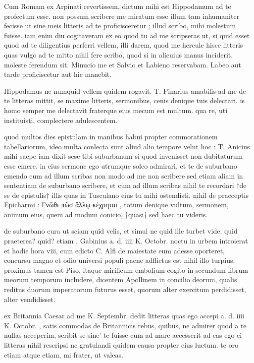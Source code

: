  Cum Romam ex Arpinati revertissem, dictum mihi est Hippodamum ad te profectum esse. non possum scribere me miratum esse illum tam inhumaniter fecisse ut sine meis litteris ad te proficisceretur ; illud scribo, mihi molestum fuisse. iam enim diu cogitaveram ex eo quod tu ad me scripseras ut, si quid esset quod ad te diligentius perferri vellem, illi darem, quod me hercule hisce litteris quas vulgo ad te mitto nihil fere scribo, quod si in alicuius manus inciderit, moleste ferendum sit. Minucio me et Salvio et Labieno reservabam. Labeo aut tarde proficiscetur aut hic manebit.

 Hippodamus ne numquid vellem quidem rogavit. T. Pinarius amabilis ad me de te litteras mittit, se maxime litteris, sermonibus, cenis denique tuis delectari. is homo semper me delectavit fraterque eius mecum est multum. qua re, uti instituisti, complectere adulescentem.

 quod multos dies epistulam in manibus habui propter commorationem tabellariorum, ideo multa conlecta sunt aliud alio tempore velut hoc : T. Anicius mihi saepe iam dixit sese tibi suburbanum si quod invenisset non dubitaturum esse emere. in eius sermone ego utrumque soleo admirari, et te de suburbano emendo cum ad illum scribas non modo ad me non scribere sed etiam aliam in sententiam de suburbano scribere, et cum ad illum scribas nihil te recordari †de se de epistulis† illis quas in Tusculano eius tu mihi ostendisti, nihil de praeceptis Epicharmi : Γνῶθι πῶσ ἄλλῳ κέχρηται , totum denique vultum, sermonem, animum eius, quem ad modum conicio, †quasi† sed haec tu videris.

 de suburbano cura ut sciam quid velis, et simul ne quid ille turbet vide. quid praeterea? quid? etiam . Gabinius a. d. iiii K. Octobr. noctu in urbem introierat et hodie hora viii, cum edicto C. Alfi de maiestate eum adesse oporteret, concursu magno et odio universi populi paene adflictus est nihil illo turpius. proximus tamen est Piso. itaque mirificum embolium cogito in secundum librum meorum temporum includere, dicentem Apollinem in concilio deorum, qualis reditus duorum imperatorum futurus esset, quorum alter exercitum perdidisset, alter vendidisset.

 ex Britannia Caesar ad me K. Septembr. dedit litteras quas ego accepi a. d. iiii K. Octobr. , satis commodas de Britannicis rebus, quibus, ne admirer quod a te nullas acceperim, scribit se sine' te fuisse cum ad mare accesserit ad eas ego ei litteras nihil rescripsi ne gratulandi quidem causa propter eius luctum. te oro etiam atque etiam, mi frater, ut valeas.
